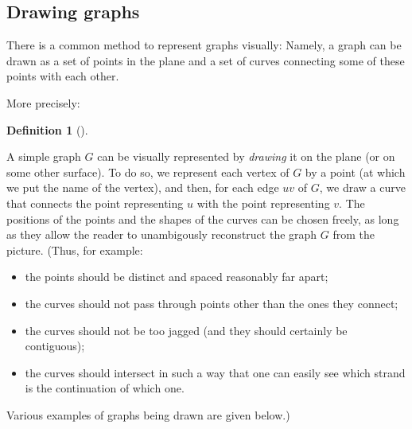 \documentclass[numbers=enddot,12pt,final,onecolumn,notitlepage]{scrartcl}%
\theoremstyle{definition}
\newtheorem{defi}[theo]{Definition}
\newenvironment{definition}[1][]
{\begin{defi}[#1]\begin{leftbar}}
{\end{leftbar}\end{defi}}
\begin{document}
\subsection{\label{sect.intro.draw}Drawing graphs}

There is a common method to represent graphs visually: Namely, a graph
can be drawn as a set of points in the plane and a set of curves
connecting some of these points with each other.

More precisely:

\begin{definition} \label{def.intro.draw}
A simple graph $G$ can be visually represented by
\textit{drawing} it on the plane (or on some other surface).
To do so, we represent each vertex of $G$ by a point (at which we
put the name of the vertex),
and then, for each edge $uv$ of $G$, we draw a
curve that connects the point representing $u$ with the point
representing $v$. The positions of the points and the shapes of the
curves can be chosen freely, as long as they allow the reader to
unambigously reconstruct the graph $G$ from the picture.
(Thus, for example:
\begin{itemize}
\item the points should be distinct and spaced
reasonably far apart;
\item the curves should not pass through points other than the ones
they connect;
\item the curves should not be too jagged (and they should certainly
be contiguous);
\item the curves should intersect in such a way that one can easily
see which strand is the continuation of which one.
\end{itemize}
Various examples of graphs being drawn are given below.)
\end{definition}
\end{document}
